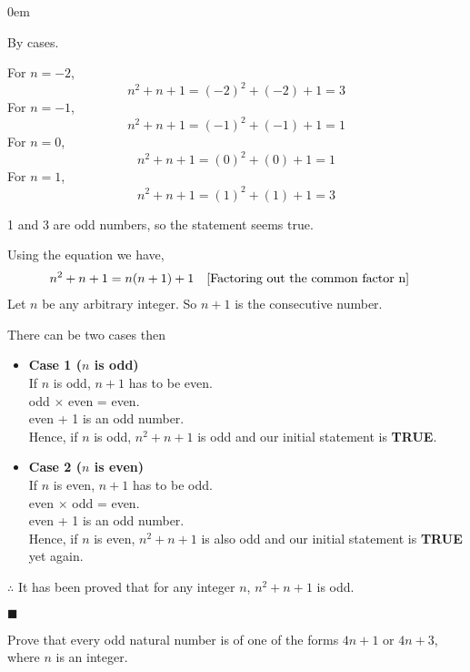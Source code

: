 \documentclass[12pt]{article}
\renewcommand{\qed}{\hfill$\blacksquare$}
\renewenvironment{proof}{\begin{addmargin}[1em]{0em}\begin{newproof}}{\end{newproof}\end{addmargin}\qed}
\newenvironment{problem}[2][Problem]{\begin{trivlist}
\item[\hskip \labelsep {\bfseries #1}\hskip \labelsep {\bfseries #2.}]}{\end{trivlist}}
\begin{document}
\begin{proof}
By cases.

For $n = -2$,
$$n^2+n+1 = (-2)^2+(-2)+1 = 3$$
For $n = -1$,
$$n^2+n+1 = (-1)^2+(-1)+1 = 1$$
For $n = 0$,
$$n^2+n+1 = (0)^2+(0)+1 = 1$$
For $n = 1$,
$$n^2+n+1 = (1)^2+(1)+1 = 3$$

1 and 3 are odd numbers, so the statement seems true.

Using the equation we have,
\begin{align*}
    &n^2+n+1 = n(n+1) + 1 \text{\quad[Factoring out the common factor n]}
\end{align*}
Let $n$ be any arbitrary integer. So $n+1$ is the consecutive number.

There can be two cases then
\begin{itemize}
    \item \textbf{Case 1 ($n$ is odd)} \\
    If $n$ is odd, $n+1$ has to be even. \\
    odd $\times$ even = even. \\
    even + 1 is an odd number. \\
    Hence, if $n$ is odd, $n^2+n+1$ is odd and our initial statement is \textbf{TRUE}.
    \item \textbf{Case 2 ($n$ is even)} \\
    If $n$ is even, $n+1$ has to be odd. \\
    even $\times$ odd = even. \\
    even + 1 is an odd number. \\
    Hence, if $n$ is even, $n^2+n+1$ is also odd and our initial statement is \textbf{TRUE} yet again.
\end{itemize}
\hfill \break
$\therefore$ It has been proved that for any integer $n$, $n^2+n+1$ is odd.
\end{proof}

\pagebreak


\begin{problem}{4}
    Prove that every odd natural number is of one of the forms $4n + 1$ or $4n + 3$, where $n$ is an integer.
\end{problem}
\end{document}
